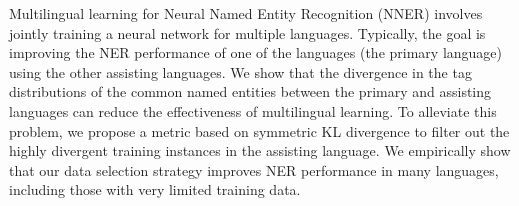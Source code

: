 Multilingual learning for Neural Named Entity Recognition (NNER) involves jointly training a neural network for multiple languages. Typically, the goal is improving the NER performance of one of the languages (the primary language) using the other assisting languages. We show that the divergence in the tag distributions of the common named entities between the primary and assisting languages can reduce the effectiveness of multilingual learning. To alleviate this problem, we propose a metric based on symmetric KL divergence to filter out the highly divergent training instances in the assisting language. We empirically show that our data selection strategy improves NER performance in many languages, including those with very limited training data.
